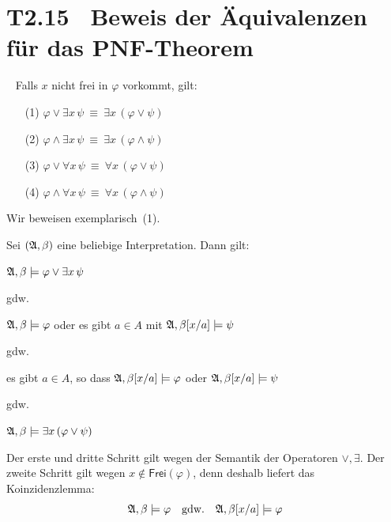 \documentclass[fontsize=11pt, twoside=false, numbers=autoenddot]{scrbook}
\begin{document}
\pagebreak
\section*{T2.15~ Beweis der Äquivalenzen für das PNF-Theorem}

~
Falls $x$ nicht frei in $\varphi$ vorkommt, gilt:
%
\begin{enumerate}
  \item[(1)]
    $\varphi \vee \exists x \, \psi   ~\equiv~ \exists x \, (\varphi \vee \psi)$
  \item[(2)]
    $\varphi \wedge \exists x \, \psi ~\equiv~ \exists x \, (\varphi \wedge \psi)$
  \item[(3)]
    $\varphi \vee \forall x \, \psi   ~\equiv~ \forall x \, (\varphi \vee \psi)$
  \item[(4)]
    $\varphi \wedge \forall x \, \psi ~\equiv~ \forall x \, (\varphi \wedge \psi)$
\end{enumerate}
%
\begin{beweis}
  Wir beweisen exemplarisch~(1).

  Sei $(\mathfrak{A}, \beta)$ eine beliebige Interpretation. Dann gilt:

  \begin{center}
    \parbox{.7\textwidth}{%
      $\mathfrak{A},\beta \models \varphi \lor \exists x\, \psi$

      \par\smallskip
      \hspace*{5mm}gdw.

      \par\smallskip
      $\mathfrak{A},\beta \models \varphi$ oder es gibt $a \in A$ mit $\mathfrak{A},\beta[x/a] \models \psi$

      \par\smallskip
      \hspace*{5mm}gdw.

      \par\smallskip
      es gibt $a \in A$, so dass $\mathfrak{A},\beta[x/a] \models \varphi$ oder $\mathfrak{A},\beta[x/a] \models \psi$

      \par\smallskip
      \hspace*{5mm}gdw.

      \par\smallskip
      $\mathfrak{A},\beta \models \exists x \, (\varphi \vee \psi)$
    }
  \end{center}

  Der erste und dritte Schritt gilt wegen der Semantik der Operatoren $\lor,\exists$.
  Der zweite Schritt gilt wegen $x \notin \textsf{Frei}(\varphi)$,
  denn deshalb liefert das Koinzidenzlemma:
  \[
    \mathfrak{A},\beta \models \varphi
    \quad\text{gdw.}\quad
    \mathfrak{A},\beta[x/a] \models \varphi
  \]
  ~\par\vspace*{-2.4\baselineskip}
   \qedhere
\end{beweis}%
\end{document}
